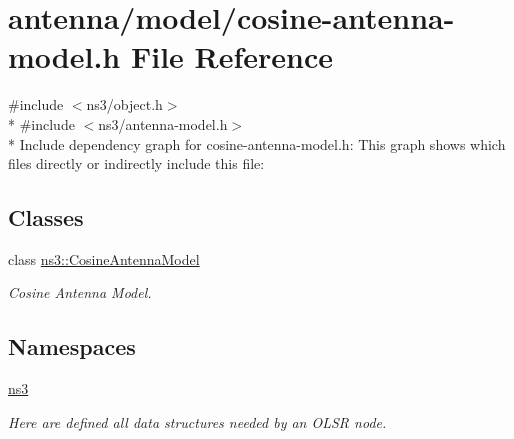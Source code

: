\hypertarget{cosine-antenna-model_8h}{}\section{antenna/model/cosine-\/antenna-\/model.h File Reference}
\label{cosine-antenna-model_8h}
{\ttfamily \#include $<$ns3/object.\+h$>$}\\*
{\ttfamily \#include $<$ns3/antenna-\/model.\+h$>$}\\*
Include dependency graph for cosine-\/antenna-\/model.h\+:
This graph shows which files directly or indirectly include this file\+:
\subsection*{Classes}
\begin{DoxyCompactItemize}
\item 
class \hyperlink{classns3_1_1CosineAntennaModel}{ns3\+::\+Cosine\+Antenna\+Model}
\begin{DoxyCompactList}\small\item\em Cosine Antenna Model. \end{DoxyCompactList}\end{DoxyCompactItemize}
\subsection*{Namespaces}
\begin{DoxyCompactItemize}
\item 
 \hyperlink{namespacens3}{ns3}
\begin{DoxyCompactList}\small\item\em Here are defined all data structures needed by an O\+L\+SR node. \end{DoxyCompactList}\end{DoxyCompactItemize}
